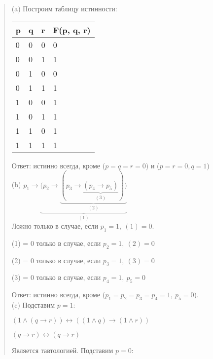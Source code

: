 \documentclass{article}
\begin{document}
\begin{quote}
\leftskip=0.2cm    
(a) Построим таблицу истинности:

\hspace{0.5cm}
\begin{tabular}{ m m m m }
    p & q & r & F(p, q, r) \\
\hline
    0 & 0 & 0 & 0 \\
    0 & 0 & 1 & 1 \\
    0 & 1 & 0 & 0 \\
    0 & 1 & 1 & 1 \\
    1 & 0 & 0 & 1 \\
    1 & 0 & 1 & 1 \\
    1 & 1 & 0 & 1 \\
    1 & 1 & 1 & 1 \\
\end{tabular}

Ответ: истинно всегда, кроме ($p = q = r = 0$) и ($p = r = 0, q = 1$) \\

(b) $p_1 \rightarrow \underbrace{(p_2 \rightarrow \underbrace{(p_3 \rightarrow \underbrace{(p_4 \rightarrow p_5)}_{(3)}))}_{(2)}}_{(1)}$\\

\hspace{0.5cm}
Ложно только в случае, если $p_1 = 1, \ (1) = 0$.

\hspace{0.5cm}
(1) = 0 только в случае, если $p_2 = 1, \ (2) = 0$

\hspace{0.5cm}
(2) = 0 только в случае, если $p_3 = 1, \ (3) = 0$

\hspace{0.5cm}
(3) = 0 только в случае, если $p_4 = 1, \ p_5 = 0$

Ответ: истинно всегда, кроме ($p_1 = p_2 = p_3 = p_4 = 1, \ p_5 = 0$).\\

(c) Подставим $p = 1$: 

\begin{center}
    
$(1 \land (q \rightarrow r)) \leftrightarrow 
((1 \land q) \rightarrow (1 \land r))$

$(q \rightarrow r) \leftrightarrow 
(q \rightarrow r)$
\end{center}

\hspace{0.5cm}
Является тавтологией. Подставим $p = 0$:
\begin{center}
    

\end{center}
\end{quote}
\end{document}
